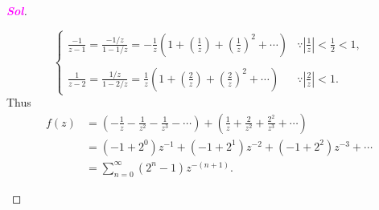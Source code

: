 \documentclass{article}
\theoremstyle{definition}
\newcommand{\of}[1]{\left( #1 \right)}
\newcommand{\abs}[1]{\left\lvert #1 \right\rvert}
\newcommand{\sol}{\textcolor{magenta}{\bf Sol}}
\begin{document}
\begin{proof}[\sol]
\begin{enumerate}[(1)]
\[\begin{cases}
			\frac{-1}{z-1}=\frac{-1/z}{1-1/z}=-\frac{1}{z}\of{1+\of{\frac{1}{z}}+\of{\frac{1}{z}}^2+\cdots} &\because\abs{\frac{1}{z}}<\frac{1}{2}<1,\\
			\\
			\frac{1}{z-2}=\frac{1/z}{1-2/z}=\frac{1}{z}\of{1+\of{\frac{2}{z}}+\of{\frac{2}{z}}^2+\cdots} &\because\abs{\frac{2}{z}}<1.
			\end{cases}
			\] Thus \begin{align*}
			f(z)&=\of{-\frac{1}{z}-\frac{1}{z^2}-\frac{1}{z^3}-\cdots}+\of{\frac{1}{z}+\frac{2}{z^2}+\frac{2^2}{z^3}+\cdots}\\
			&=(-1+2^0)z^{-1}+(-1+2^1)z^{-2}+(-1+2^2)z^{-3}+\cdots\\
			&=\sum_{n=0}^\infty\of{2^n-1}z^{-(n+1)}.
			\end{align*}
		\end{enumerate}
	\end{proof}
	
\end{document}
